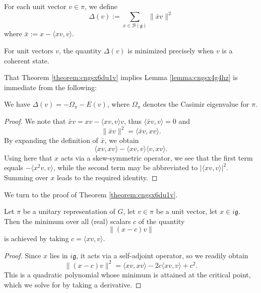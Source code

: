 \documentclass[reqno]{amsart} 
\begin{document}
\begin{definition}\label{definition:cngsx6dtkh}
  For each unit vector $v \in \pi$, we define
  \begin{equation*}
    \Delta(v) := \sum_{
      x \in \mathcal{B}(\mathfrak{g})      
    }
    \lVert \bar{x} v \rVert^2
  \end{equation*}
  where $\bar{x} := x - \langle x v, v \rangle$.
\end{definition}
\begin{theorem}\label{theorem:cngsx6du1v}
  For unit vectors $v$, the quantity $\Delta(v)$ is minimized precisely when $v$ is a coherent state.
\end{theorem}

That Theorem \ref{theorem:cngsx6du1v} implies Lemma \ref{lemma:cngsx4g4hz} is immediate from the following:
\begin{lemma}\label{lemma:cngsx6fp2j}
  We have $\Delta(v) = - \Omega_\pi - E(v)$, where $\Omega_\pi$ denotes the Casimir eigenvalue for $\pi$.
\end{lemma}
\begin{proof}
  We note that $\bar{x} v = x v - \langle x v, v \rangle v$, thus $\langle \bar{x} v, v \rangle = 0$ and
  \begin{equation*}
    \lVert \bar{x} v \rVert^2
    =
    \langle \bar{x} v, x v \rangle.
  \end{equation*}
  By expanding the definition of $\bar{x}$, we obtain
  \begin{equation*}
    \langle x v, x v \rangle
    -
    \langle x v, v \rangle \langle v, x v \rangle.
  \end{equation*}
  Using here that $x$ acts via a skew-symmetric operator, we see that the first term equals $- \langle x^2 v, v \rangle$, while the second term  may be abbreviated to $\lvert \langle x v, v \rangle \rvert^2$.  Summing over $x$ leads to the required identity.
\end{proof}

We turn to the proof of Theorem \ref{theorem:cngsx6du1v}.

\begin{lemma}\label{lemma:cngsx64916}
  Let $\pi$ be a unitary representation of $G$, let $v \in \pi$ be a unit vector, let $x \in i \mathfrak{g}$.  Then the minimum over all (real) scalars $c$ of the quantity
  \begin{equation*}
    \lVert (x - c) v \rVert
  \end{equation*}
  is achieved by taking $c = \langle x v, v \rangle$.
\end{lemma}
\begin{proof}
  Since $x$ lies in $i \mathfrak{g}$, it acts via a self-adjoint operator, so we readily obtain
  \begin{equation}\label{eq:cngsx65skq}
    \lVert (x-c) v \rVert^2
    = \langle x v, x v \rangle
    - 2 c \langle x v, v \rangle
    + c^2.
  \end{equation}
  This is a quadratic polynomial whose minimum is attained at the critical point, which we solve for by taking a derivative.
\end{proof}
\end{document}
